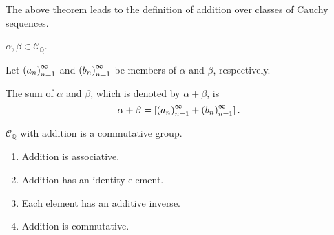 The above theorem leads to the definition of addition over classes of Cauchy sequences.

\begin{definition}
    $\alpha, \beta\in\mathscr{C}_{\mathbb{Q}}$.

    Let ${\left({a_{n}}\right)}^{\infty}_{n=1}$ and ${\left({b_{n}}\right)}^{\infty}_{n=1}$ be members of $\alpha$ and $\beta$, respectively.

    The sum of $\alpha$ and $\beta$, which is denoted by $\alpha + \beta$, is
    \[
        \alpha + \beta = \left[{{\left({a_{n}}\right)}^{\infty}_{n=1} + {\left({b_{n}}\right)}^{\infty}_{n=1}}\right].
    \]
\end{definition}

\begin{theorem}
    $\mathscr{C}_{\mathbb{Q}}$ with addition is a commutative group.
    \begin{enumerate}[label={(F\arabic*)},itemsep=0pt]
        \item Addition is associative.
        \item Addition has an identity element.
        \item Each element has an additive inverse.
        \item Addition is commutative.
    \end{enumerate}
\end{theorem}

